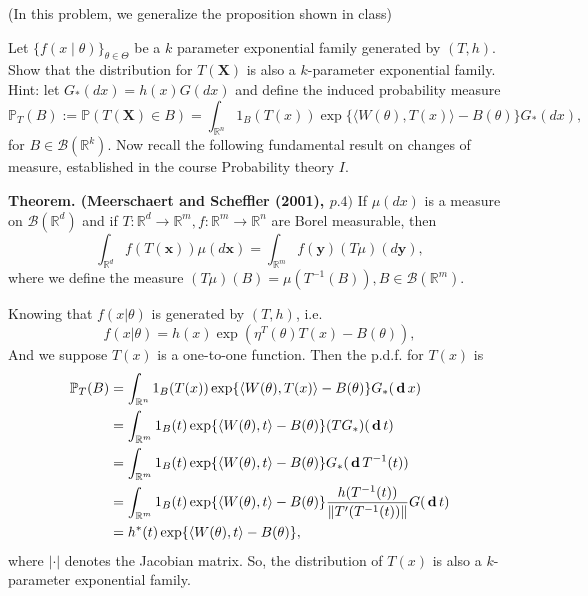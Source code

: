 \begin{exercise}
    (In this problem, we generalize the proposition shown in class) 
    
    Let \(\{f( x \mid \theta)\}_{\theta \in \Theta}\) be a \(k\) parameter exponential family generated by \((T, h)\). Show that the distribution for \(T(\mathbf{X})\) is also a \(k\)-parameter exponential family. Hint: let \(G_{*}(d  x)=h( x) G(d  x)\) and define the induced probability measure
    \[
        \mathbb{P}_{T}(B):=\mathbb{P}(T(\mathbf{X}) \in B)=\int_{\mathbb{R}^{n}} 1_{B}(T( x)) \exp \{\langle W(\theta), T( x)\rangle-B(\theta)\} G_{*}(d  x), 
    \]
    for \(B \in \mathcal{B}\left(\mathbb{R}^{k}\right)\). Now recall the following fundamental result on changes of measure, established in the course Probability theory \(I\). 

    {\bfseries Theorem. (Meerschaert and Scheffler (2001), \(p .4)\)} If \(\mu(d x)\) is a measure on \(\mathcal{B}\left(\mathbb{R}^{d}\right)\) and if \(T: \mathbb{R}^{d} \rightarrow \mathbb{R}^{m}, f: \mathbb{R}^{m} \rightarrow \mathbb{R}^{n}\) are Borel measurable, then
    \[
        \int_{\mathbb{R}^{d}} f(T(\boldsymbol{x})) \mu(d \boldsymbol{x})=\int_{\mathbb{R}^{m}} f(\boldsymbol{y})(T \mu)(d \boldsymbol{y}),
    \]
    where we define the measure \((T \mu)(B)=\mu\left(T^{-1}(B)\right), B \in \mathcal{B}\left(\mathbb{R}^{m}\right)\). 
\end{exercise}

\begin{solution}
    Knowing that $f(x|\theta)$ is generated by $(T,h)$, i.e. 
    \[
        f(x|\theta)=h(x)\exp\left(\eta^T(\theta)T(x)-B(\theta)\right), 
    \]
    And we suppose $T(x)$ is a one-to-one function. Then the p.d.f. for $T(x)$ is
    \[
        \begin{aligned}
            \mathbb{P}_{T}(B)&=\int_{\mathbb{R}^{n}} 1_{B}(T( x)) \exp \{\langle W(\theta), T( x)\rangle-B(\theta)\} G_{*}(\,\mathbf{d}\,  x)\\
            &=\int_{\mathbb{R}^m}1_{B}(t) \exp \{\langle W(\theta), t\rangle-B(\theta)\}( TG_{*})(\,\mathbf{d}\, t)\\
            &=\int_{\mathbb{R}^m}1_{B}(t) \exp \{\langle W(\theta), t\rangle-B(\theta)\}G_*(\,\mathbf{d}\, T^{-1}(t))\\
            &=\int_{\mathbb{R}^m}1_{B}(t) \exp \{\langle W(\theta), t\rangle-B(\theta)\}\frac{h(T^{-1}(t))}{\|T'(T^{-1}(t))\|}G(\,\mathbf{d}\, t)\\
            &=h^*(t)\exp \{\langle W(\theta), t\rangle-B(\theta)\}, 
        \end{aligned}
    \]
    where $|\cdot|$ denotes the Jacobian matrix. So, the distribution of $T(x)$ is also a $k$-parameter exponential family. 
\end{solution}

